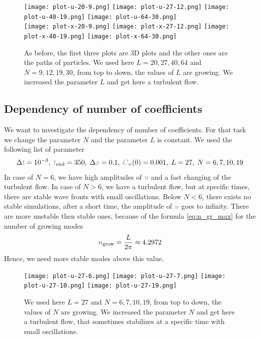 \documentclass[10pt,fleqn, %
reqno,a4paper]{article}
\makeatletter
\def\mathcolor#1#{\@mathcolor{#1}}
\def\@mathcolor#1#2#3{%
        \protect\leavevmode
        \begingroup\color#1{#2}#3\endgroup
}
\newcommand{\nx}{\mathcolor{gray}{x}}
\newcommand{\nt}{\mathcolor{gray}{t}}
\newcommand{\nnu}{\mathcolor{cyan!70!black}{u}}
\newcommand{\nn}{\mathcolor{red!70!black}{n}}
\newcommand{\nC}{\mathcolor{cyan!70!black}{C}}
\makeatother
\begin{document}
\begin{figure}[htp!]
        \begin{center}
        \texttt{[image: plot-u-20-9.png]}
        \texttt{[image: plot-u-27-12.png]}
        \texttt{[image: plot-u-40-19.png]}
        \texttt{[image: plot-u-64-30.png]}\\
        \texttt{[image: plot-x-20-9.png]}
        \texttt{[image: plot-x-27-12.png]}
        \texttt{[image: plot-x-40-19.png]}
        \texttt{[image: plot-x-64-30.png]}
        \caption{As before, the first three plots are 3D plots and the other ones are the paths of particles. We used here $ L = 20, 27, 40, 64 $ and $ N = 9, 12, 19, 30$, from top to down, the values of $ L $ are growing. We increased the parameter $ L $ and get here a turbulent flow. }
        \label{pic:turbulent}
        \end{center}
\end{figure}

\newpage

\subsection{Dependency of number of coefficients }\label{sec:coeff}
We want to investigate the dependency of number of coefficients. 
For that task we change the parameter $ N $ and the parameter $ L $ is constant. 
We used the following list of parameter
\begin{align*}
\Delta \nt = 10^{-3},\; \nt_{\mathrm{end}} = 350,\; \Delta \nx = 0.1,\; \nC_{\nn}(0) =  0.001,\; L = 27,\; N = 6, 7, 10, 19
\end{align*}
In case of $ N = 6 $, we have high amplitudes of $ \nnu $ and a fast changing of the turbulent flow.
In case of $ N > 6 $, we have a turbulent flow, but at specific times, there are stable wave fronts with small oscillations.
Below $ N < 6 $, there exists no stable simulations, after a short time, the amplitude of $ \nnu $ goes to infinity. 
There are more unstable then stable ones, because of the formula \eqref{eq:n_gr_max} for the number of growing modes
\begin{align*}
        \nn_{\mathrm{grow}} = \frac{L}{2\pi} \approx 4.2972
\end{align*}
Hence, we need more stable modes above this value.
\begin{figure}[htp!]
                \texttt{[image: plot-u-27-6.png]}
                \texttt{[image: plot-u-27-7.png]}
                \texttt{[image: plot-u-27-10.png]}
                \texttt{[image: plot-u-27-19.png]}
                \caption{We used here $ L = 27 $ and $ N = 6, 7, 10, 19$, from top to down, the values of $ N $ are growing. We increased the parameter $ N $ and get here a turbulent flow, that sometimes stabilizes at a specific time with small oscillations.}
                \label{pic:coeff}
\end{figure}
\end{document}
